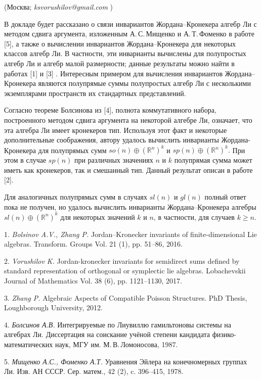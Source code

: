

\vzmsinfo(Москва; {\it ksvorushilov@gmail.com} )


В докладе будет рассказано о связи инвариантов Жорда\-на--Кронекера алгебр Ли с методом сдвига аргумента, изложенным А.\,С.\,Мищенко и А.\,Т.\,Фоменко в работе [5], а также о вычислении инвариантов Жордана--Кронекера для некоторых классов алгебр Ли. В частности, эти инварианты вычислены для полупростых алгебр Ли и алгебр малой размерности; данные результаты можно найти в работах [1] и [3] . Интересным примером для вычисления инвариантов Жордана--Кронекера являются полупрямые суммы полупростых алгебр Ли с несколькими экземплярами пространств их стандартных представлений.

Согласно теореме Болсинова из [4], полнота коммутативного набора, построенного методом сдвига аргумента на некоторой алгебре Ли, означает, что эта алгебра Ли имеет кронекеров тип. Используя этот факт и некоторые дополнительные соображения, автору удалось вычислить инварианты Жордана-Кронекера для полупрямых сумм  $so(n)\oplus (\mathbb{R}^n)^k$ и  $sp(n)\oplus (\mathbb{R}^n)^k.$ При этом в случае $sp(n)$ при различных значениях $n$ и $k$ полупрямая сумма может иметь как кронекеров, так и смешанный тип. Данный результат описан в работе [2].

Для аналогичных полупрямых сумм в случаях $sl(n)$ и $gl(n)$ полный ответ пока не получен, но удалось вычислить инварианты Жордана--Кронекера алгебры $sl(n)\oplus (\mathbb{R}^n)^k$ для некоторых значений $k$ и $n$, в частности, для случаев $k\geqslant n.$



\litlist

1. {\it Bolsinov A.V., Zhang P.} Jordan–Kronecker invariants of finite-dimensional Lie algebras. Transform. Groups Vol. 21 (1), pp. 51--86, 2016.

2. {\it Vorushilov K.} Jordan-kronecker invariants for semidirect sums defined by standard representation of orthogonal or symp\-lec\-tic lie algebras. Lobachevskii Journal of Mathematics Vol. 38 (6), pp. 1121--1130, 2017.

3. {\it Zhang P.} Algebraic Aspects of Compatible Poisson Struc\-tures. PhD Thesis, Loughborough University, 2012.

4. {\it Болсинов А.В.} Интегрируемые по Лиувиллю гамильтоновы системы на алгебрах Ли. Диссертация на соискание учёной степени кандидата физико-математических наук, МГУ им. М.\,В.\,Ломоносова, 1987.

5. {\it Мищенко А.С., Фоменко А.Т.} Уравнения Эйлера на конечномерных группах Ли. Изв. АН СССР. Сер. матем., 42 (2), c. 396–415, 1978.



